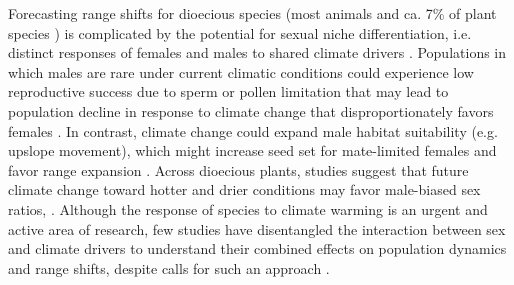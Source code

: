 \documentclass[9pt,twocolumn,twoside,lineno]{pnas-new}
\newcommand{\jacob}[2]{{\color{blue}{#1}}\footnote{\textit{\color{blue}{#2}}}}
\newcommand{\revise}[1]{{\color{Mahogany}{#1}}}
\begin{document}
Forecasting range shifts for dioecious species (most animals and  ca. 7\% of plant species \citep{heilbuth2000lower}) is complicated by the potential for sexual niche differentiation, i.e. distinct responses of females and males to shared climate drivers \citep{hultine2016climate,morrison2016causes}. 
Populations in which males are rare under current climatic conditions could experience low reproductive success due to sperm or pollen limitation that may lead to population decline in response to climate change that disproportionately favors females \citep{eberhart2017sex}.
In contrast, climate change could expand male habitat suitability (e.g. upslope movement), which might increase seed set for mate-limited females and favor range expansion \citep{petry2016sex}. 
Across dioecious plants, studies suggest that future climate change toward hotter and drier conditions may favor male-biased sex ratios, \revise{likely due to lower costs of male reproduction that enable greater stress tolerance} \citep{field2013comparative,hultine2016climate}. 
Although the response of species to climate warming is an urgent and active area of research, few studies have disentangled the interaction between sex and climate drivers to understand their combined effects on population dynamics and range shifts, despite calls for such an approach \citep{hultine2016climate,gissi2023exploring}.
\end{document}
